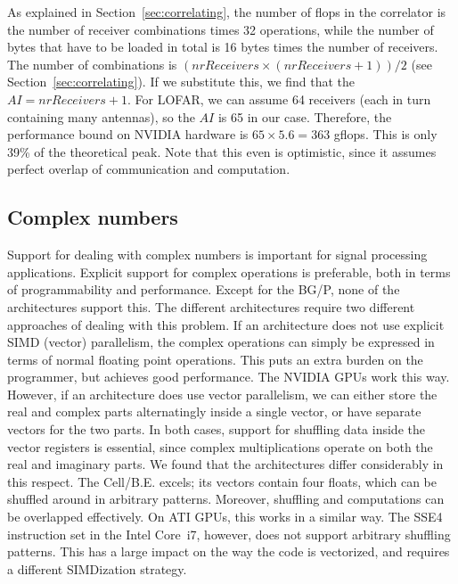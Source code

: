 \documentclass{article}
\begin{document}
As explained in Section~\ref{sec:correlating}, the number of flops in the correlator is the
number of receiver combinations times 32 operations, while the number
of bytes that have to be loaded in total is 16 bytes times the number
of receivers.  The
number of combinations is $(nrReceivers \times (nrReceivers + 1)) / 2$ (see Section~\ref{sec:correlating}).
If we substitute this, we find that the $AI = nrReceivers + 1$.  For
LOFAR, we can assume 64 receivers (each in turn containing many
antennas), so the $AI$ is 65 in our case.  Therefore, the performance
bound on NVIDIA hardware is $65 \times 5.6 = 363$ gflops. This is only
39\% of the theoretical peak.  Note that this even is optimistic,
since it assumes perfect overlap of communication and computation.


\subsection{Complex numbers}

Support for dealing with complex numbers is important for signal
processing applications. Explicit support for complex operations is
preferable, both in terms of programmability and performance. 
Except for the BG/P, none of the architectures support this.
The different architectures require two different approaches of
dealing with this problem. If an architecture does not use
explicit SIMD (vector) parallelism, the complex operations can simply
be expressed in terms of normal floating point operations. This puts
an extra burden on the programmer, but achieves good performance. The
NVIDIA GPUs work this way.  However, if an architecture does use vector
parallelism, we can either store the real and complex parts alternatingly inside a
single vector, or have separate vectors for the two parts.  In both
cases, support for shuffling data inside the vector registers is
essential, since complex multiplications operate on both the real and imaginary parts.
We found that the architectures differ considerably in this
respect.  The \mbox{Cell/B.E.} excels; its vectors contain four floats, which
can be shuffled around in arbitrary patterns. Moreover, 
shuffling and computations can be overlapped effectively.  On ATI
GPUs, this works in a similar way.  The SSE4 instruction set in the
Intel Core~i7, however, does not support arbitrary shuffling patterns.
This has a large impact on the way the code is vectorized, and
requires a different SIMDization strategy. 
\end{document}
